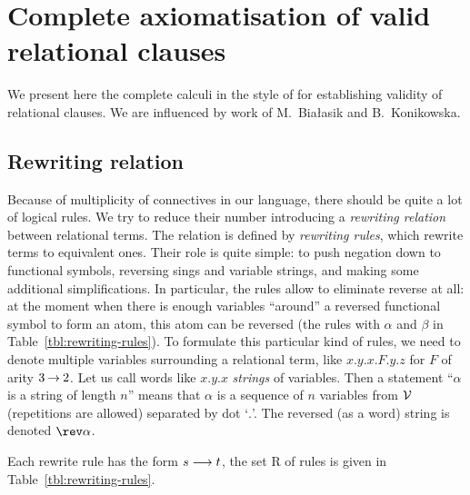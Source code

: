 \section{Complete axiomatisation of valid relational clauses}
\label {sec:axiomatisation}

We present here the complete calculi in the style of \cite{R-S} for
establishing validity of relational clauses.  We are influenced by work \cite
{Marcin} of M.~Bia{\l}asik and B.~Konikowska.

\subsection{Rewriting relation}

Because of multiplicity of connectives in our language, there should be quite
a lot of logical rules.  We try to reduce their number introducing
a {\em rewriting relation} between relational terms.  The relation is
defined by {\em rewriting rules}, which rewrite terms to equivalent ones.
Their role is quite simple: to push negation down to functional symbols, 
reversing sings and variable strings, and making some additional
simplifications.  In particular, the rules allow to eliminate reverse at all:
at the moment when there is enough variables ``around'' a reversed
functional symbol to form an atom, this atom can be reversed (the rules with
$\alpha$ and $\beta$ in Table~\ref {tbl:rewriting-rules}).  To formulate
this particular kind of rules, we need to denote multiple variables surrounding
a relational term, like \(x.y.x.F.y.z\) for $F$ of arity \(3\mathbin{\rightarrow}2\).
Let us call words like \(x.y.x\) {\em strings} of variables. Then a statement
``$\alpha$ is a string of length $n$'' means that $\alpha$ is a sequence of
$n$ variables from ${\cal V}$ (repetitions are allowed) separated by dot `$.$'.
The reversed (as a word) string is denoted $\rev\alpha$.
 
Each rewrite rule has the form \(s\longrightarrow t\), the set \C R of rules is
given in Table~\ref {tbl:rewriting-rules}.

